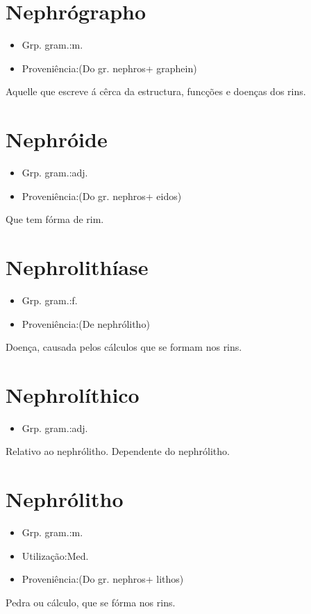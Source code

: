 \section{Nephrógrapho}
\begin{itemize}
\item {Grp. gram.:m.}
\end{itemize}
\begin{itemize}
\item {Proveniência:(Do gr. \textunderscore nephros\textunderscore  + \textunderscore graphein\textunderscore )}
\end{itemize}
Aquelle que escreve á cêrca da estructura, funcções e doenças dos rins.
\section{Nephróide}
\begin{itemize}
\item {Grp. gram.:adj.}
\end{itemize}
\begin{itemize}
\item {Proveniência:(Do gr. \textunderscore nephros\textunderscore  + \textunderscore eidos\textunderscore )}
\end{itemize}
Que tem fórma de rim.
\section{Nephrolithíase}
\begin{itemize}
\item {Grp. gram.:f.}
\end{itemize}
\begin{itemize}
\item {Proveniência:(De \textunderscore nephrólitho\textunderscore )}
\end{itemize}
Doença, causada pelos cálculos que se formam nos rins.
\section{Nephrolíthico}
\begin{itemize}
\item {Grp. gram.:adj.}
\end{itemize}
Relativo ao nephrólitho.
Dependente do nephrólitho.
\section{Nephrólitho}
\begin{itemize}
\item {Grp. gram.:m.}
\end{itemize}
\begin{itemize}
\item {Utilização:Med.}
\end{itemize}
\begin{itemize}
\item {Proveniência:(Do gr. \textunderscore nephros\textunderscore  + \textunderscore lithos\textunderscore )}
\end{itemize}
Pedra ou cálculo, que se fórma nos rins.
